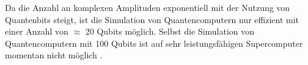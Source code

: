 Da die Anzahl an komplexen Amplituden exponentiell mit der Nutzung von Quantenbits steigt, ist die Simulation von Quantencomputern nur effizient mit einer Anzahl von $\approx$ 20 Qubits m\"oglich. Selbst die Simulation von Quantencomputern mit 100 Qubits ist auf sehr leistungsf\"ahigen Supercomputer momentan nicht m\"oglich \cite{Qiskit-Textbook}.
